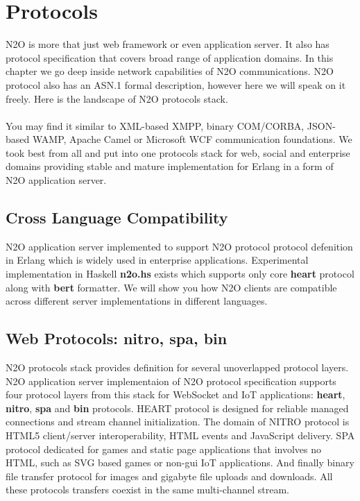 \section{Protocols}
N2O is more that just web framework or even application server.
It also has protocol specification that covers broad range of application domains.
In this chapter we go deep inside network capabilities of N2O communications.
N2O protocol also has an ASN.1 formal description, however here we will speak on it freely.
Here is the landscape of N2O protocols stack.


\paragraph{}
You may find it similar to XML-based XMPP, binary COM/CORBA,
JSON-based WAMP, Apache Camel or Microsoft WCF communication foundations.
We took best from all and put into one protocols stack for web,
social and enterprise domains providing stable and mature implementation for Erlang
in a form of N2O application server.

\newpage
\subsection*{Cross Language Compatibility}
N2O application server implemented to support N2O protocol protocol defenition
in Erlang which is widely used in enterprise applications.
Experimental implementation in Haskell {\bf n2o.hs} exists
which supports only core {\bf heart} protocol along with {\bf bert} formatter.
We will show you how N2O clients are compatible across
different server implementations in different languages.

\subsection*{Web Protocols: {\bf nitro}, {\bf spa}, {\bf bin}}
N2O protocols stack provides definition for several unoverlapped protocol layers.
N2O application server implementaion of N2O protocol specification supports
four protocol layers from this stack for WebSocket and IoT applications: {\bf heart}, {\bf nitro}, {\bf spa} and {\bf bin} protocols.
HEART protocol is designed for reliable managed connections and stream channel initialization.
The domain of NITRO protocol is HTML5 client/server interoperability, HTML events and JavaScript delivery.
SPA protocol dedicated for games and static page applications that involves no HTML,
such as SVG based games or non-gui IoT applications.
And finally binary file transfer protocol for images and gigabyte file uploads and downloads.
All these protocols transfers coexist in the same multi-channel stream.

